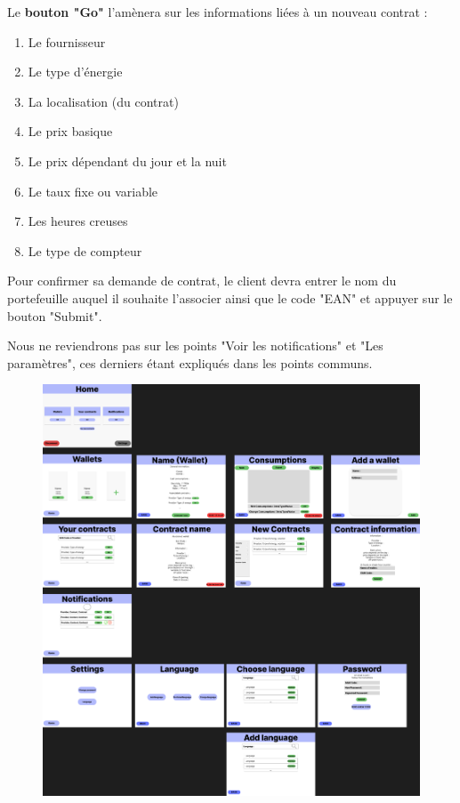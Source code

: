 \begin{flushleft}
Le \textbf{bouton "Go"} l'amènera sur les informations liées à un nouveau contrat :
\end{flushleft}
\begin{enumerate}
\item Le fournisseur
\item Le type d'énergie
\item La localisation (du contrat)
\item Le prix basique
\item Le prix dépendant du jour et la nuit
\item Le taux fixe ou variable
\item Les heures creuses
\item Le type de compteur
\end{enumerate}
\begin{flushleft}
Pour confirmer sa demande de contrat, le client devra entrer le nom du portefeuille auquel il souhaite l'associer ainsi que le code "EAN" et appuyer sur le bouton "Submit".
\end{flushleft}

\begin{flushleft}
Nous ne reviendrons pas sur les points "Voir les notifications" et "Les paramètres", ces derniers étant expliqués dans les points communs. 
\end{flushleft}

\begin{figure}
    \centering
    \includegraphics[width = 1\textwidth]{Base/interface/img/Client.png}
\end{figure}

